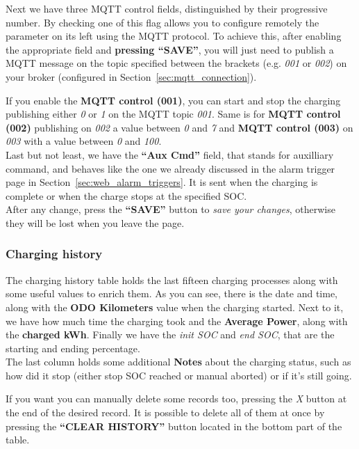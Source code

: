 Next we have three MQTT control fields, distinguished by their progressive number.
By checking one of this flag allows you to configure remotely the parameter on its left
using the MQTT protocol. To achieve this, after enabling the appropriate field and
\textbf{pressing “SAVE”}, you will just need to publish a MQTT message on the topic
specified between the brackets (e.g. \textit{001} or \textit{002}) on your broker
(configured in Section~\ref{sec:mqtt_connection}).

If you enable the \textbf{MQTT control (001)}, you can start and stop
the charging publishing either \textit{0} or \textit{1} on the MQTT topic \textit{001}.
Same is for \textbf{MQTT control (002)} publishing on \textit{002} a value between
\textit{0} and \textit{7} and \textbf{MQTT control (003)} on \textit{003} with a value
between \textit{0} and \textit{100}.\\

Last but not least, we have the \textbf{“Aux Cmd”} field, that stands for auxilliary
command, and behaves like the one we already discussed in the alarm trigger page in
Section~\ref{sec:web_alarm_triggers}. It is sent when the charging is complete or
when the charge stops at the specified SOC.\\


After any change, press the \textbf{“SAVE”} button to \textit{save your changes}, otherwise they will be lost when you leave the page.

\subsubsection{Charging history}

The charging history table holds the last fifteen charging processes along with some
useful values to enrich them. As you can see, there is the date and time, along with
the \textbf{ODO Kilometers} value when the charging started. Next to it, we have how
much time the charging took and the \textbf{Average Power}, along with the \textbf{charged kWh}.
Finally we have the \textit{init SOC} and \textit{end SOC}, that are the starting and ending percentage.\\


The last column holds some additional \textbf{Notes} about the charging status, such
as how did it stop (either stop SOC reached or manual aborted) or if it's still going.

If you want you can manually delete some records too, pressing the \textit{X} button
at the end of the desired record. It is possible to delete all of them at once by
pressing the \textbf{“CLEAR HISTORY”} button located in the bottom part of the table.


